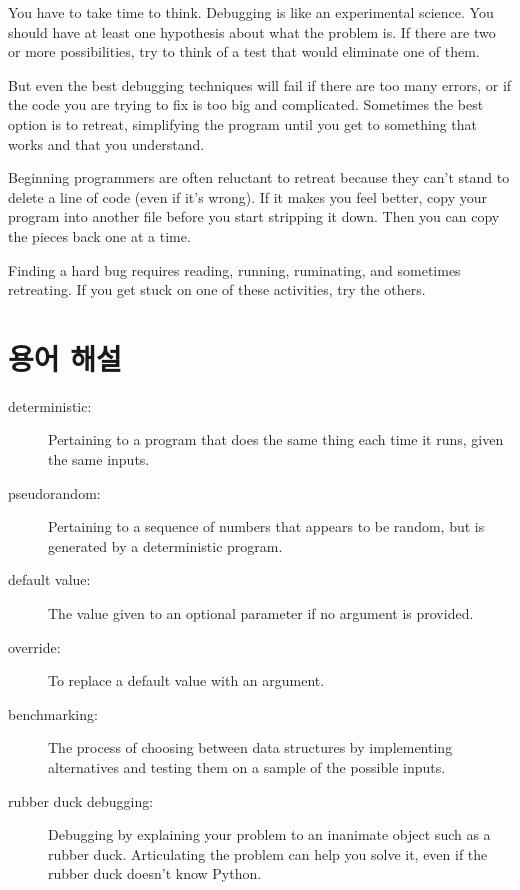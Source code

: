 \documentclass[10pt]{book}
\begin{document}
You have to take time to think.  Debugging is like an
experimental science.  You should have at least one hypothesis about
what the problem is.  If there are two or more possibilities, try to
think of a test that would eliminate one of them.

But even the best debugging techniques will fail if there are too many
errors, or if the code you are trying to fix is too big and
complicated.  Sometimes the best option is to retreat, simplifying the
program until you get to something that works and that you
understand.

Beginning programmers are often reluctant to retreat because
they can't stand to delete a line of code (even if it's wrong).
If it makes you feel better, copy your program into another file
before you start stripping it down.  Then you can copy the pieces
back one at a time.

Finding a hard bug requires reading, running, ruminating, and
sometimes retreating.  If you get stuck on one of these activities,
try the others.


\section{용어 해설}

\begin{description}

\item[deterministic:] Pertaining to a program that does the same
thing each time it runs, given the same inputs.

\item[pseudorandom:] Pertaining to a sequence of numbers that appears
to be random, but is generated by a deterministic program.

\item[default value:] The value given to an optional parameter if no
argument is provided.

\item[override:] To replace a default value with an argument.

\item[benchmarking:] The process of choosing between data structures
by implementing alternatives and testing them on a sample of the
possible inputs.  

\item[rubber duck debugging:] Debugging by explaining your problem
to an inanimate object such as a rubber duck.  Articulating the
problem can help you solve it, even if the rubber duck doesn't know
Python. 

\end{description}
\end{document}
